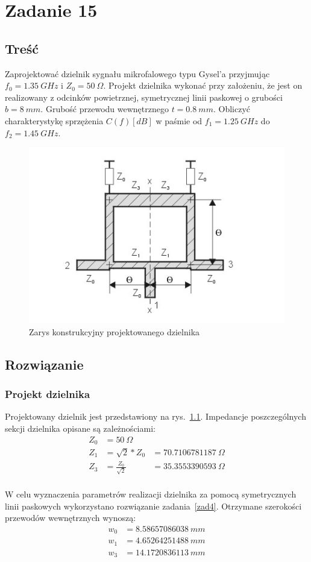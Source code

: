 \documentclass[rep.tex]{subfiles}
\begin{document}
\chapter{Zadanie 15}
\label{zad15}
\section{Treść}
Zaprojektować dzielnik sygnału mikrofalowego typu Gysel’a przyjmując $f_0 = 1.35~GHz$ i $Z_0 = 50~\Omega$.
Projekt dzielnika wykonać przy założeniu, że jest on realizowany z odcinków powietrznej,
symetrycznej linii paskowej o grubości $b = 8~mm$.
Grubość przewodu wewnętrznego $t = 0.8~mm$.
Obliczyć charakterystykę sprzężenia $C(f)[dB]$ w paśmie od $f_1 = 1.25~GHz$ do $f_2 = 1.45~GHz$.

\begin{figure}[!htbp]
  \centering
  \includegraphics[width=0.5\linewidth]{fig/zad15/div}
  \caption{Zarys konstrukcyjny projektowanego dzielnika}
  \label{fig:zad15:div}
\end{figure}

\section{Rozwiązanie}
\subsection{Projekt dzielnika}
Projektowany dzielnik jest przedstawiony na rys.~\ref{fig:zad15:div}.
Impedancje poszczególnych sekcji dzielnika opisane są zależnościami:
\begin{align}
  Z_0 &= 50~\Omega \nonumber \\
  Z_1 &= \sqrt{2} * Z_0 &= 70.7106781187~\Omega \\
  Z_3 &= \frac{Z_0}{\sqrt{2}} &= 35.3553390593~\Omega \\
\end{align}

W celu wyznaczenia parametrów realizacji dzielnika za pomocą symetrycznych linii paskowych wykorzystano rozwiązanie zadania~\ref{zad4}.
Otrzymane szerokości przewodów wewnętrznych wynoszą:
\begin{align}
  w_0 &= 8.58657086038~mm \nonumber \\
  w_1 &= 4.65264251488~mm \nonumber \\
  w_3 &= 14.1720836113~mm \nonumber
\end{align}
\end{document}
